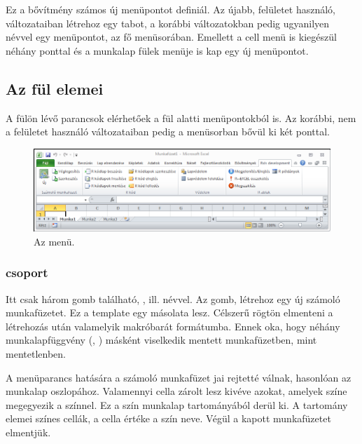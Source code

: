 Ez a bővítmény számos új menüpontot definiál. Az  újabb, 
felületet használó, változataiban létrehoz egy 
tabot, a korábbi változatokban pedig 
ugyanilyen névvel egy menüpontot, az  fő menüsorában. Emellett a
cell menü is kiegészül néhány ponttal és a munkalap fülek menüje is kap
egy új menüpontot. 

\subsection{Az  fül elemei}
A  fülön lévő parancsok elérhetőek a
 fül alatti %
menüpontokból is. Az  korábbi, nem a 
felületet használó változataiban pedig a menüsorban bővül ki két ponttal. 
\begin{figure}[h]
  \centering
  \includegraphics{images/Rxls_development_menu}
  \caption{Az  menü.}
  \label{fig:3.1}
\end{figure}

\subsubsection{ csoport}
Itt csak három gomb található, , 
ill.  névvel.
Az  gomb, létrehoz egy új számoló munkafüzetet. Ez a 
template egy másolata lesz. Célszerű rögtön elmenteni a létrehozás
után valamelyik makróbarát formátumba. Ennek oka, hogy néhány munkalapfüggvény 
(, ) másként viselkedik mentett munkafüzetben, mint
mentetlenben.

A  menüparancs hatására a számoló munkafüzet jai rejtetté válnak, hasonlóan az  munkalap
 oszlopához. Valamennyi cella zárolt lesz 
kivéve azokat, amelyek színe megegyezik a  színnel. Ez a
szín  munkalap 
 tartományából derül ki. A tartomány elemei színes
cellák, a cella értéke a szín neve. Végül a kapott munkafüzetet elmentjük.

